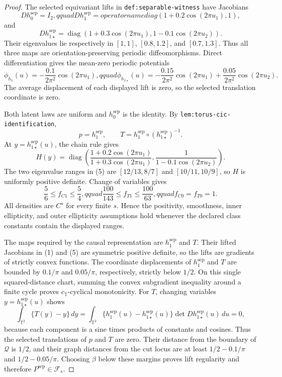 \documentclass{article}
\begin{document}
\begin{proof}
The selected equivariant lifts in \texttt{def:separable-witness} have Jacobians
\[
 Dh_0^{\mathrm{sep}}=I_2,qquad
 Dh_1^{\mathrm{sep}}=operatorname{diag}(1+0.2\cos(2\pi u_1),1),       \tag{1}
\]
and
\[
 Dh_{1\star}^{\mathrm{sep}}
 =\operatorname{diag}(1+0.3\cos(2\pi u_1),
                       1-0.1\cos(2\pi u_2)).                           \tag{2}
\]
Their eigenvalues lie respectively in \([1,1]\), \([0.8,1.2]\), and \([0.7,1.3]\).  Thus all three maps are orientation-preserving periodic diffeomorphisms.  Direct differentiation gives the mean-zero periodic potentials
\[
 \phi_{h_1}(u)=-\frac{0.1}{2\pi^2}\cos(2\pi u_1),qquad
 \phi_{h_{1\star}}(u)
 =-\frac{0.15}{2\pi^2}\cos(2\pi u_1)
  +\frac{0.05}{2\pi^2}\cos(2\pi u_2).                                \tag{3}
\]
The average displacement of each displayed lift is zero, so the selected translation coordinate is zero.

Both latent laws are uniform and \(h_0^{\mathrm{sep}}\) is the identity.  By \texttt{lem:torus-cic-identification},
\[
 p=h_1^{\mathrm{sep}},\qquad
 T=h_1^{\mathrm{sep}}\circ(h_{1\star}^{\mathrm{sep}})^{-1}.           \tag{4}
\]
At \(y=h_{1\star}^{\mathrm{sep}}(u)\), the chain rule gives
\[
 H(y)=\operatorname{diag}\!\left(
 \frac{1+0.2\cos(2\pi u_1)}{1+0.3\cos(2\pi u_1)},
 \frac1{1-0.1\cos(2\pi u_2)}\right).                                \tag{5}
\]
The two eigenvalue ranges in (5) are \([12/13,8/7]\) and \([10/11,10/9]\), so \(H\) is uniformly positive definite.  Change of variables gives
\[
 \frac56\leq f_{C1}\leq\frac54,qquad
 \frac{100}{143}\leq f_{T1}\leq\frac{100}{63},qquad
 f_{C0}=f_{T0}=1.                                                       \tag{6}
\]
All densities are \(C^s\) for every finite \(s\).  Hence the positivity, smoothness, inner ellipticity, and outer ellipticity assumptions hold whenever the declared class constants contain the displayed ranges.

The maps required by the causal representation are \(h_1^{\mathrm{sep}}\) and \(T\).  Their lifted Jacobians in (1) and (5) are symmetric positive definite, so the lifts are gradients of strictly convex functions.  The coordinate displacements of \(h_1^{\mathrm{sep}}\) and \(T\) are bounded by \(0.1/\pi\) and \(0.05/\pi\), respectively, strictly below \(1/2\).  On this single squared-distance chart, summing the convex subgradient inequality around a finite cycle proves \(c_{\mathbb T}\)-cyclical monotonicity.  For \(T\), changing variables \(y=h_{1\star}^{\mathrm{sep}}(u)\) shows
\[
 \int_{\mathbb T^2}\{T(y)-y\}\,dy
 =\int_{\mathbb T^2}\{h_1^{\mathrm{sep}}(u)-h_{1\star}^{\mathrm{sep}}(u)\}
   \det Dh_{1\star}^{\mathrm{sep}}(u)\,du=0,                         \tag{7}
\]
because each component is a sine times products of constants and cosines.  Thus the selected translations of \(p\) and \(T\) are zero.  Their distance from the boundary of \(\mathcal Q\) is \(1/2\), and their graph distances from the cut locus are at least \(1/2-0.1/\pi\) and \(1/2-0.05/\pi\).  Choosing \(\beta\) below these margins proves lift regularity and therefore \(P^{\mathrm{sep}}\in\mathcal F_s\).


\end{proof}
\end{document}
